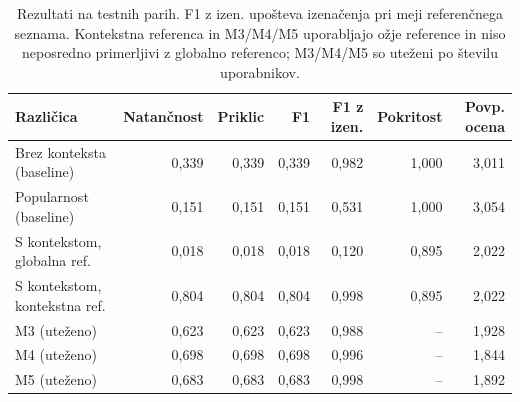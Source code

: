 \begin{table}[h]
\centering
\caption{Rezultati na testnih parih. F1 z izen. upošteva izenačenja pri meji referenčnega seznama. Kontekstna referenca in M3/M4/M5 uporabljajo ožje reference in niso neposredno primerljivi z globalno referenco; M3/M4/M5 so uteženi po številu uporabnikov.}
\label{tab:table_4_5}
\footnotesize
\setlength{\tabcolsep}{3pt}
\begin{tabular}{lrrrrrr}
\toprule
Različica & Natančnost & Priklic & F1 & F1 z izen. & Pokritost & Povp. ocena \\
\midrule
Brez konteksta (baseline) & 0,339 & 0,339 & 0,339 & 0,982 & 1,000 & 3,011 \\
Popularnost (baseline) & 0,151 & 0,151 & 0,151 & 0,531 & 1,000 & 3,054 \\
S kontekstom, globalna ref. & 0,018 & 0,018 & 0,018 & 0,120 & 0,895 & 2,022 \\
S kontekstom, kontekstna ref. & 0,804 & 0,804 & 0,804 & 0,998 & 0,895 & 2,022 \\
M3 (uteženo) & 0,623 & 0,623 & 0,623 & 0,988 & -- & 1,928 \\
M4 (uteženo) & 0,698 & 0,698 & 0,698 & 0,996 & -- & 1,844 \\
M5 (uteženo) & 0,683 & 0,683 & 0,683 & 0,998 & -- & 1,892 \\
\bottomrule
\end{tabular}

\end{table}
